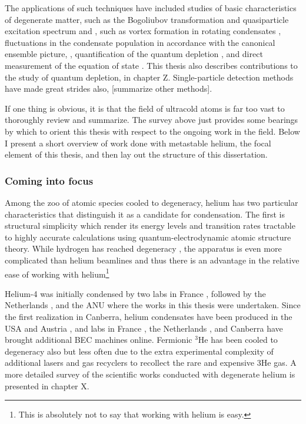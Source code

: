 	The applications of such techniques have included studies of basic characteristics of degenerate matter, such as the Bogoliubov transformation and quasiparticle excitation spectrum and  \cite{Steinhauer02,Vogels02},	such as vortex formation in rotating condensates \cite{Madison00}, fluctuations in the condensate population in accordance with the canonical ensemble picture, \cite{Kristensen19}, quantification of the quantum depletion \cite{Xu06,Lopes17_depletion}, and direct measurement of the equation of state \cite{Mordini20}. 
	This thesis also describes contributions to the study of quantum depletion, in chapter Z.
	Single-particle detection methods have made great strides also, \cite{Ott16} [summarize other methods].

	If one thing is obvious, it is that the field of ultracold atoms is far too vast to thoroughly review and summarize. The survey above just provides some bearings by which to orient this thesis with respect to the ongoing work in the field. Below I present a short overview of work done with metastable helium, the focal element of this thesis, and then lay out the structure of this dissertation.

		
\subsubsection*{Coming into focus} %

	
		
	Among the zoo of atomic species cooled to degeneracy, helium has two particular characteristics that distinguish it as a candidate for condensation. The first is structural simplicity which render its energy levels and transition rates tractable to highly accurate calculations using quantum-electrodynamic atomic structure theory. While hydrogen has reached degeneracy \cite{Fried98}, the apparatus is even more complicated than helium beamlines and thus there is an advantage in the relative ease of working with helium\footnote{This is absolutely not to say that working with helium is easy.}

	Helium-4 was initially condensed by two labs in France \cite{Robert01,Santos01}, followed by the Netherlands \cite{Tychkov06}, and the ANU \cite{Dall07} where the works in this thesis were undertaken. Since the first realization in Canberra, helium condensates have been produced in the USA \cite{Doret09} and Austria \cite{Keller15}, and labs in France \cite{Bouton15}, the Netherlands \cite{Flores15}, and Canberra \cite{Abbas21} have brought additional \mhe BEC machines online.
	Fermionic $^3$He has been cooled to degeneracy also but less often due to the extra experimental complexity of additional lasers and gas recyclers to recollect the rare and expensive 3He gas.
	A more detailed survey of the scientific works conducted with degenerate helium is presented in chapter X. 

